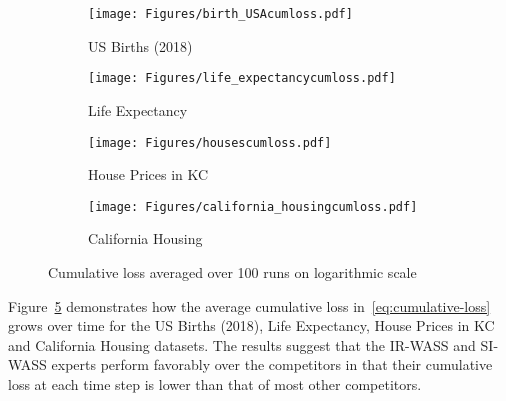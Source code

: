 \documentclass{article}
\begin{document}
    \begin{figure}
     \centering
     \begin{subfigure}[b]{0.45\textwidth}
         \centering
         \texttt{[image: Figures/birth\_USAcumloss.pdf]}
         \caption{US Births (2018)}
         \label{fig:us_births}
     \end{subfigure}\hfill
     \begin{subfigure}[b]{0.45\textwidth}
         \centering
         \texttt{[image: Figures/life\_expectancycumloss.pdf]}
         \caption{Life Expectancy}
         \label{fig:life_exp}
     \end{subfigure}\hfill
     \begin{subfigure}[b]{0.45\textwidth}
         \centering
         \texttt{[image: Figures/housescumloss.pdf]}
         \caption{House Prices in KC}
         \label{fig:houses}
     \end{subfigure}\hfill
     \begin{subfigure}[b]{0.45\textwidth}
         \centering
         \texttt{[image: Figures/california\_housingcumloss.pdf]}
         \caption{California Housing}
         \label{fig:california_housing}
     \end{subfigure}\hfill
        \caption{Cumulative loss averaged over 100 runs on logarithmic scale}
        \label{fig:cum_loss_all}
\end{figure}
Figure~\ref{fig:cum_loss_all} demonstrates how the average cumulative loss in~\eqref{eq:cumulative-loss} grows over time for the US Births (2018), Life Expectancy, House Prices in KC and California Housing datasets. 
The results suggest that the IR-WASS and SI-WASS experts perform favorably over the competitors in that their cumulative loss at each time step is lower than that of most other competitors.  
    \newpage


\end{document}
